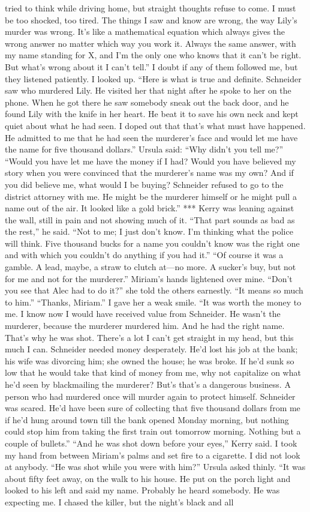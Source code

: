 \documentclass{novel}
\begin{document}
tried to think while driving home, but straight thoughts refuse to come. I must be too shocked, too tired. The things I saw and know are wrong, the way Lily’s murder was wrong. It’s like a mathematical equation which always gives the wrong answer no matter which way you work it. Always the same answer, with my name standing for X, and I’m the only one who knows that it can’t be right. But what’s wrong about it I can’t tell.” I doubt if any of them followed me, but they listened patiently. I looked up. “Here is what is true and definite. Schneider saw who murdered Lily. He visited her that night after he spoke to her on the phone. When he got there he saw somebody sneak out the back door, and he found Lily with the knife in her heart. He beat it to save his own neck and kept quiet about what he had seen. I doped out that that’s what must have happened. He admitted to me that he had seen the murderer’s face and would let me have the name for five thousand dollars.” Ursula said: “Why didn’t you tell me?” “Would you have let me have the money if I had? Would you have believed my story when you were convinced that the murderer’s name was my own? And if you did believe me, what would I be buying? Schneider refused to go to the district attorney with me. He might be the murderer himself or he might pull a name out of the air. It looked like a gold brick.” *** Kerry was leaning against the wall, still in pain and not showing much of it. “That part sounds as bad as the rest,” he said. “Not to me; I just don’t know. I’m thinking what the police will think. Five thousand bucks for a name you couldn’t know was the right one and with which you couldn’t do anything if you had it.” “Of course it was a gamble. A lead, maybe, a straw to clutch at—no more. A sucker’s buy, but not for me and not for the murderer.” Miriam’s hands lightened over mine. “Don’t you see that Alec had to do it?” she told the others earnestly. “It means so much to him.” “Thanks, Miriam.” I gave her a weak smile. “It was worth the money to me. I know now I would have received value from Schneider. He wasn’t the murderer, because the murderer murdered him. And he had the right name. That’s why he was shot. There’s a lot I can’t get straight in my head, but this much I can. Schneider needed money desperately. He’d lost his job at the bank; his wife was divorcing him; she owned the house; he was broke. If he’d sunk so low that he would take that kind of money from me, why not capitalize on what he’d seen by blackmailing the murderer? But’s that’s a dangerous business. A person who had murdered once will murder again to protect himself. Schneider was scared. He’d have been sure of collecting that five thousand dollars from me if he’d hung around town till the bank opened Monday morning, but nothing could stop him from taking the first train out tomorrow morning. Nothing but a couple of bullets.” “And he was shot down before your eyes,” Kerry said. I took my hand from between Miriam’s palms and set fire to a cigarette. I did not look at anybody. “He was shot while you were with him?” Ursula asked thinly. “It was about fifty feet away, on the walk to his house. He put on the porch light and looked to his left and said my name. Probably he heard somebody. He was expecting me. I chased the killer, but the night’s black and all 
\end{document}
